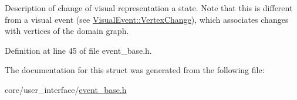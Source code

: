 Description of change of visual representation a state. Note that this is different from a visual event (see \hyperlink{structslb_1_1core_1_1ui_1_1VisualEvent_1_1VertexChange}{Visual\+Event\+::\+Vertex\+Change}), which associates changes with vertices of the domain graph. 

Definition at line 45 of file event\+\_\+base.\+h.



The documentation for this struct was generated from the following file\+:\begin{DoxyCompactItemize}
\item 
core/user\+\_\+interface/\hyperlink{event__base_8h}{event\+\_\+base.\+h}\end{DoxyCompactItemize}
